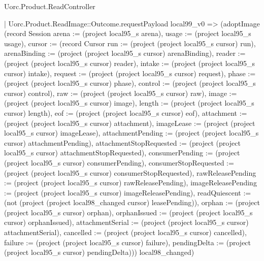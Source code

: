 \begin{lexlean}{Uorc.Product.ReadController}
\begin{semanticmodule}
{      | Uorc.Product.ReadImage::Outcome.requestPayload local99_v0 => (adoptImage (record Session {arena := (project local95_s arena), usage := (project local95_s usage), cursor := (record Cursor {run := (project (project local95_s cursor) run), arenaBinding := (project (project local95_s cursor) arenaBinding), reader := (project (project local95_s cursor) reader), intake := (project (project local95_s cursor) intake), request := (project (project local95_s cursor) request), phase := (project (project local95_s cursor) phase), control := (project (project local95_s cursor) control), raw := (project (project local95_s cursor) raw), image := (project (project local95_s cursor) image), length := (project (project local95_s cursor) length), eof := (project (project local95_s cursor) eof), attachment := (project (project local95_s cursor) attachment), imageLease := (project (project local95_s cursor) imageLease), attachmentPending := (project (project local95_s cursor) attachmentPending), attachmentStopRequested := (project (project local95_s cursor) attachmentStopRequested), consumerPending := (project (project local95_s cursor) consumerPending), consumerStopRequested := (project (project local95_s cursor) consumerStopRequested), rawReleasePending := (project (project local95_s cursor) rawReleasePending), imageReleasePending := (project (project local95_s cursor) imageReleasePending), readQuiescent := (not (project (project local98_changed cursor) leasePending)), orphan := (project (project local95_s cursor) orphan), orphanIssued := (project (project local95_s cursor) orphanIssued), attachmentSerial := (project (project local95_s cursor) attachmentSerial), cancelled := (project (project local95_s cursor) cancelled), failure := (project (project local95_s cursor) failure), pendingDelta := (project (project local95_s cursor) pendingDelta)})}) local98_changed)
}
\end{semanticmodule}
\end{lexlean}
